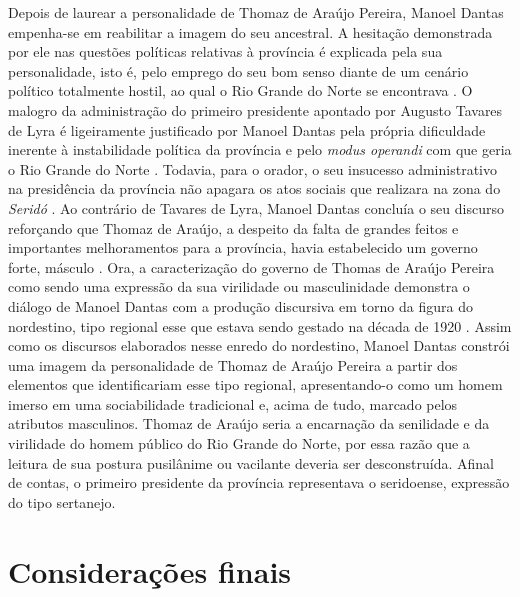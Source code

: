 \begin{refsection}
    Depois de laurear a personalidade de Thomaz de Araújo Pereira, Manoel Dantas empenha-se em reabilitar a imagem do seu ancestral. A hesitação demonstrada por ele nas questões políticas relativas à província é explicada pela sua personalidade, isto é, pelo emprego do seu bom senso diante de um cenário político totalmente hostil, ao qual o Rio Grande do Norte se encontrava \cite[p.~184]{DiscursoManoealDantas}. O malogro da administração do primeiro presidente apontado por Augusto Tavares de Lyra é ligeiramente justificado por Manoel Dantas pela própria dificuldade inerente à instabilidade política da província e pelo \textit{modus operandi} com que geria o Rio Grande do Norte \cite[p.~185]{DiscursoManoealDantas}. Todavia, para o orador, o seu insucesso administrativo na presidência da província não apagara os atos sociais que realizara na zona do \textit{Seridó} \cite[p.~187]{DiscursoManoealDantas}. Ao contrário de Tavares de Lyra, Manoel Dantas concluía o seu discurso reforçando que Thomaz de Araújo, a despeito da falta de grandes feitos e importantes melhoramentos para a província, havia estabelecido um governo forte, másculo \cite[p.~193]{DiscursoManoealDantas}. Ora, a caracterização do governo de Thomas de Araújo Pereira como sendo uma expressão da sua virilidade ou masculinidade demonstra o diálogo de Manoel Dantas com a produção discursiva em torno da figura do nordestino, tipo regional esse que estava sendo gestado na década de 1920 \cite[p.~207--209]{AlbuquerqueJr2013Nordestino}. Assim como os discursos elaborados nesse enredo do nordestino, Manoel Dantas constrói uma imagem da personalidade de Thomaz de Araújo Pereira a partir dos elementos que identificariam esse tipo regional, apresentando-o como um homem imerso em uma sociabilidade tradicional e, acima de tudo, marcado pelos atributos masculinos. Thomaz de Araújo seria a encarnação da senilidade e da virilidade do homem público do Rio Grande do Norte, por essa razão que a leitura de sua postura pusilânime ou vacilante deveria ser desconstruída. Afinal de contas, o primeiro presidente da província representava o seridoense, expressão do tipo sertanejo.

    \section{Considerações finais}


\end{refsection}
